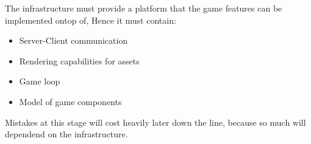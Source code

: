 The infrastructure must provide a platform that the game features can be implemented ontop of, Hence it must contain:
\begin{itemize}
\item Server-Client communication
\item Rendering capabilities for assets
\item Game loop
\item Model of game components
\end{itemize}

Mistakes at this stage will cost heavily later down the line, because so much will dependend on the infrastructure. 

\begin{comment}

alpha stage layout
------------------
features wanted at this stage:
    - networking
    - server client loop
    - game update model (lock-step no no no)
    - ship move orders
    - world rendering(easy debugging)
    - more focus around infrastructure than features
    
    
  - lack of libraries, implemeintg our own networking, GUI library.
  - implementation of network library.
  - server and client not distinquished just yet
  - game loop
  - lock-step big part
    - arguments for and against
  - integration of assets into game
  - API for game how entities are added
  - how generating diffs will work

  - infrastructure components
    - networking
    - gameploop
    - how the server and client synchronize
    - graphics


\end{comment}
